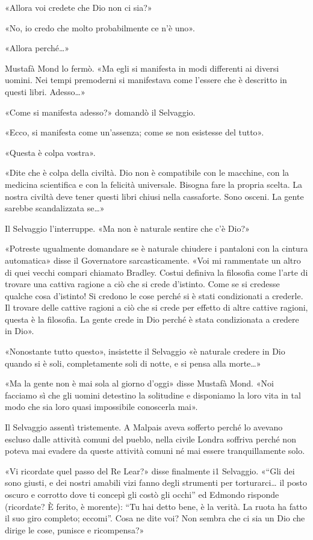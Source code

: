 \documentclass[
a5paper, %
10pt, %
twoside, 
onecolumn, %
openany, %
]{memoir}
\begin{document}
«Allora voi credete che Dio non ci sia?»

«No, io credo che molto probabilmente ce n’è uno».

«Allora perché…»

Mustafà Mond lo fermò. «Ma egli si manifesta in modi differenti ai diversi uomini. Nei tempi premoderni si manifestava come l’essere che è descritto in questi libri. Adesso…»

«Come si manifesta adesso?» domandò il Selvaggio.

«Ecco, si manifesta come un’assenza; come se non esistesse del tutto».

«Questa è colpa vostra».

«Dite che è colpa della civiltà. Dio non è compatibile con le macchine, con la medicina scientifica e con la felicità universale. Bisogna fare la propria scelta. La nostra civiltà deve tener questi libri chiusi nella cassaforte. Sono osceni. La gente sarebbe scandalizzata se…»

Il Selvaggio l’interruppe. «Ma non è naturale sentire che c’è Dio?»

«Potreste ugualmente domandare se è naturale chiudere i pantaloni con la cintura automatica» disse il Governatore sarcasticamente. «Voi mi rammentate un altro di quei vecchi compari chiamato Bradley. Costui definiva la filosofia come l’arte di trovare una cattiva ragione a ciò che si crede d’istinto. Come se si credesse qualche cosa d’istinto! Si credono le cose perché si è stati condizionati a crederle. Il trovare delle cattive ragioni a ciò che si crede per effetto di altre cattive ragioni, questa è la filosofia. La gente crede in Dio perché è stata condizionata a credere in Dio».

«Nonostante tutto questo», insistette il Selvaggio «è naturale credere in Dio quando si è soli, completamente soli di notte, e si pensa alla morte…»

«Ma la gente non è mai sola al giorno d’oggi» disse Mustafà Mond. «Noi facciamo sì che gli uomini detestino la solitudine e disponiamo la loro vita in tal modo che sia loro quasi impossibile conoscerla mai».

Il Selvaggio assentì tristemente. A Malpais aveva sofferto perché lo avevano escluso dalle attività comuni del pueblo, nella civile Londra soffriva perché non poteva mai evadere da queste attività comuni né mai essere tranquillamente solo.

«Vi ricordate quel passo del Re Lear?» disse finalmente i1 Selvaggio. «“Gli dei sono giusti, e dei nostri amabili vizi fanno degli strumenti per torturarci… il posto oscuro e corrotto dove ti concepì gli costò gli occhi” ed Edmondo risponde (ricordate? È ferito, è morente): “Tu hai detto bene, è la verità. La ruota ha fatto il suo giro completo; eccomi”. Cosa ne dite voi? Non sembra che ci sia un Dio che dirige le cose, punisce e ricompensa?»
\end{document}
